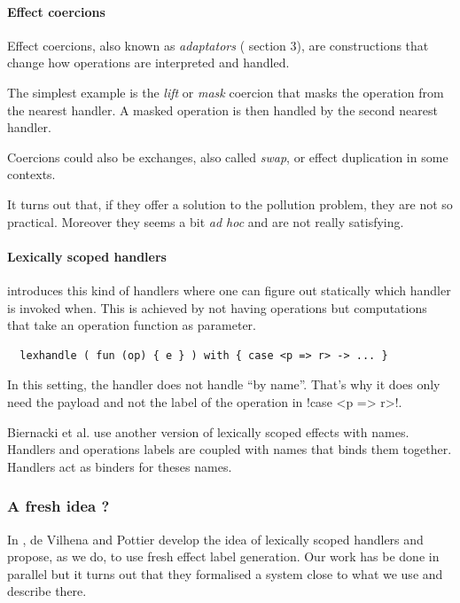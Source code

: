 \documentclass[11pt, nonacm=true, language=french, language=english]{acmart}
\begin{document}
\paragraph{Effect coercions}
Effect coercions, also known as \emph{adaptators} (\citep{doobeedoo} section 3), are constructions that change how operations are interpreted and handled.

The simplest example is the \emph{lift} or \emph{mask} coercion that masks the operation from the nearest handler. A masked operation is then handled by the second nearest handler.

Coercions could also be exchanges, also called \emph{swap}, or effect duplication in some contexts.

It turns out that, if they offer a solution to the pollution problem, they are not so practical. Moreover they seems a bit \emph{ad hoc} and are not really satisfying.

\paragraph{Lexically scoped handlers}
\cite{lex-eff} introduces this kind of handlers where one can figure out statically which handler is invoked when. This is achieved by not having operations but computations that take an operation function as parameter.
\begin{lstlisting}
  lexhandle ( fun (op) { e } ) with { case <p => r> -> ... }
\end{lstlisting}
\begin{rem}
  In this setting, the handler does not handle ``by name''. That's why it does only need the payload and not the label of the operation in !case <p => r>!.
\end{rem}

Biernacki et al. \cite{binders-labels} use another version of lexically scoped effects with names. Handlers and operations labels are coupled with names that binds them together. Handlers act as binders for theses names.

\subsubsection{A fresh idea ?}
\label{sec:fresh-idea}

In \cite{tes}, de Vilhena and Pottier develop the idea of lexically scoped handlers and propose, as we do, to use fresh effect label generation. Our work has be done in parallel but it turns out that they formalised a system close to what we use and describe there.
\end{document}
